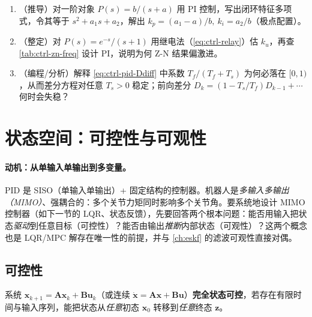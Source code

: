 \begin{practice}
\begin{enumerate}
  \item （推导）对一阶对象 $P(s)=b/(s+a)$ 用 PI 控制，写出闭环特征多项式，令其等于 $s^2+a_1s+a_2$，解出 $k_p=(a_1-a)/b,\ k_i=a_2/b$（极点配置）。
  \item （整定）对 $P(s)=e^{-s}/(s+1)$ 用继电法（\cref{eq:ctrl-relay}）估 $k_u$，再查 \cref{tab:ctrl-zn-freq} 设计 PI，说明为何 Z-N 结果偏激进。
  \item （编程/分析）解释 \cref{eq:ctrl-pid-Ddiff} 中系数 $T_f/(T_f+T_s)$ 为何必落在 $[0,1)$，从而差分方程对任意 $T_s>0$ 稳定；前向差分 $D_k=(1-T_s/T_f)D_{k-1}+\cdots$ 何时会失稳？
\end{enumerate}
\end{practice}

\section{状态空间：可控性与可观性}
\label{sec:ctrl-statespace}

\paragraph{动机：从单输入单输出到多变量。}
PID 是 SISO（单输入单输出）+ 固定结构的控制器。机器人是\emph{多输入多输出（MIMO）}、强耦合的：多个关节力矩同时影响多个关节角。要系统地设计 MIMO 控制器（如下一节的 LQR、状态反馈），先要回答两个根本问题：能否用输入把状态\emph{驱动}到任意目标（可控性）？能否由输出\emph{推断}内部状态（可观性）？这两个概念也是 LQR/MPC 解存在唯一性的前提，并与 \cref{ch:eskf} 的滤波可观性直接对偶。

\subsection{可控性}
\label{sec:ctrl-controllability}

\begin{definition}[完全状态可控]
\label{def:ctrl-controllable}
系统 $\mathbf{x}_{k+1}=\mathbf{A}\mathbf{x}_k+\mathbf{B}\mathbf{u}_k$（或连续 $\dot{\mathbf{x}}=\mathbf{A}\mathbf{x}+\mathbf{B}\mathbf{u}$）\textbf{完全状态可控}，若存在有限时间与输入序列，能把状态从\emph{任意}初态 $\mathbf{x}_0$ 转移到\emph{任意}终态 $\mathbf{z}$。
\end{definition}

